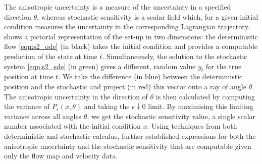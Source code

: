 The anisotropic uncertainty is a measure of the uncertainty in a specified direction \(\theta\), whereas stochastic sensitivity is a scalar field which, for a given initial condition measures the uncertainty in the corresponding Lagrangian trajectory.
 shows a pictorial representation of the set-up in two dimensions: the deterministic flow \cref{eqn:s2_ode} (in black) takes the initial condition and provides a computable prediction of the state at time \(t\).
Simultaneously, the solution to the stochastic system \cref{eqn:s2_sde} (in green) gives a different, random value \(y_t\) for the true position at time \(t\).
We take the difference (in blue) between the deterministic position and the stochastic and project (in red) this vector onto a ray of angle \(\theta\).
The anisotropic uncertainty in the direction of \(\theta\) is then calculated by computing the variance of \(P_{\epsilon}\!\left(x, \theta\right)\) and taking the \(\epsilon\downarrow 0\) limit.
By maximising this limiting variance across all angles \(\theta\), we get the stochastic sensitivity value, a single scalar number associated with the initial condition \(x\).
Using techniques from both deterministic and stochastic calculus, \citet{Balasuriya_2020_StochasticSensitivityComputable} further established expressions for both the anisotropic uncertainty and the stochastic sensitivity that are computable given only the flow map and velocity data.

